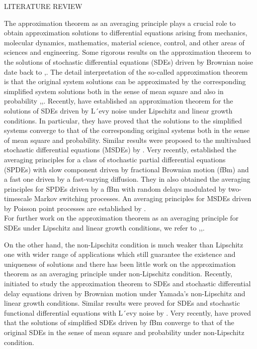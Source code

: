 \documentclass[unknownkeysallowed, compress]{beamer}
\theoremstyle{plain}
\begin{document}
\begin{frame}[allowframebreaks]{LITERATURE REVIEW}
\par The approximation theorem as an averaging principle plays a crucial role to
obtain approximation solutions to differential equations arising from mechanics,
molecular dynamics, mathematics, material science, control, and other areas of sciences and engineering. Some rigorous results on the approximation theorem to the
solutions of stochastic differential equations (SDEs) driven by Brownian noise date
back to \cite{6},\cite{7}. The detail interpretation of the so-called approximation theorem is that the original system solutions can be approximated by the
corresponding simplified system solutions both in the sense of mean square and
also in probability \cite{16},\cite{8},\cite{1}. Recently, \cite{20} have established an approximation theorem for the solutions of SDEs driven by L´evy noise under Lipschitz
and linear growth conditions. In particular, they have proved that the solutions
to the simplified systems converge to that of the corresponding original systems
both in the sense of mean square and probability. Similar results were proposed to
the multivalued stochastic differential equations (MSDEs) by \cite{21}. Very recently, \cite{13} established the averaging principles for a class of stochastic partial
differential equations (SPDEs) with slow component driven by fractional Brownian
motion (fBm) and a fast one driven by a fast-varying diffusion. They in \cite{14} also
obtained the averaging principles for SPDEs driven by a fBm with random delays
modulated by two-timescale Markov switching processes. An averaging principles
for MSDEs driven by Poisson point processes are established by \cite{3}.\\
For further work on the approximation theorem as an averaging principle for SDEs
under Lipschitz and linear growth conditions, we refer to \cite{19},\cite{23},\cite{22}.\\

\par On the other hand, the non-Lipschitz condition is much weaker than Lipschitz
one with wider range of applications which still guarantee the existence and uniqueness of solutions and there has been little work on the approximation theorem as an
averaging principle under non-Lipschitz condition. Recently, \cite{17} initiated to study the approximation theorem to SDEs and stochastic differential delay
equations driven by Brownian motion under Yamada’s non-Lipschitz and linear
growth conditions. Similar results were proved for SDEs and stochastic functional
differential equations with L´evy noise by \cite{24}. Very recently, \cite{25}
have proved that the solutions of simplified SDEs driven by fBm converge to that
of the original SDEs in the sense of mean square and probability under \cite{18} non-Lipschitz condition.\\


\end{frame}
\end{document}
